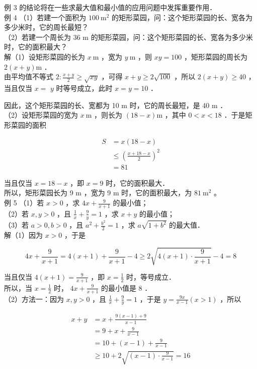 \documentclass[10pt]{article}
\begin{document}
例 3 的结论将在一些求最大值和最小值的应用问题中发挥重要作用．\\
例 4 （1）若建一个面积为 \(100 \mathrm{~m}^{2}\) 的矩形菜园，问：这个矩形菜园的长、宽各为多少米时，它的周长最短？\\
（2）若建一个周长为 36 m 的矩形菜园，问：这个矩形菜园的长、宽各为多少米时，它的面积最大？\\
解（1）设矩形菜园的长为 \(x \mathrm{~m}\) ，宽为 \(y \mathrm{~m}\) ，则 \(x y=100\) ，矩形菜园的周长为 \(2(x+y) \mathrm{m}\) ．\\
由平均值不等式 \(2: \frac{x+y}{2} \geqslant \sqrt{x y}\) ，可得 \(x+y \geqslant 2 \sqrt{100}\) ，所以 \(2(x+y) \geqslant 40\) ，当且仅当 \(x=\) \(y\) 时等号成立，此时 \(x=y=10\) ．

因此，这个矩形菜园的长、宽都为 10 m 时，它的周长最短，是 40 m ．\\
（2）设矩形菜园的宽为 \(x \mathrm{~m}\) ，则长为 \((18-x) \mathrm{m}\) ，其中 \(0<x<18\) ．于是矩形菜园的面积

\[
\begin{aligned}
S & =x(18-x) \\
& \leqslant\left(\frac{x+18-x}{2}\right)^{2} \\
& =81
\end{aligned}
\]

当且仅当 \(x=18-x\) ，即 \(x=9\) 时，它的面积最大．\\
所以，矩形菜园长为 9 m ，宽为 9 m 时，它的面积最大，为 \(81 \mathrm{~m}^{2}\) 。\\
例 5 （1）若 \(x>0\) ，求 \(4 x+\frac{9}{x+1}\) 的最小值；\\
（2）若 \(x, y>0\) ，且 \(\frac{1}{x}+\frac{9}{y}=1\) ，求 \(x+y\) 的最小值；\\
（3）若 \(a>0, b>0\) ，且 \(a^{2}+\frac{b^{2}}{2}=1\) ，求 \(a \sqrt{1+b^{2}}\) 的最大值．\\
解（1）因为 \(x>0\) ，于是

\[
4 x+\frac{9}{x+1}=4(x+1)+\frac{9}{x+1}-4 \geqslant 2 \sqrt{4(x+1) \cdot \frac{9}{x+1}}-4=8
\]

当且仅当 \(4(x+1)=\frac{9}{x+1}\) ，即 \(x=\frac{1}{2}\) 时，等号成立．\\
所以，当 \(x=\frac{1}{2}\) 时， \(4 x+\frac{9}{x+1}\) 的最小值是 8 ．\\
（2）方法一：因为 \(x, y>0\) ，且 \(\frac{1}{x}+\frac{9}{y}=1\) ，于是 \(y=\frac{9 x}{x-1}(x>1)\) ，所以

\[
\begin{aligned}
x+y & =x+\frac{9(x-1)+9}{x-1} \\
& =9+x+\frac{9}{x-1} \\
& =10+(x-1)+\frac{9}{x-1} \\
& \geqslant 10+2 \sqrt{(x-1) \cdot \frac{9}{x-1}}=16
\end{aligned}
\]
\end{document}
